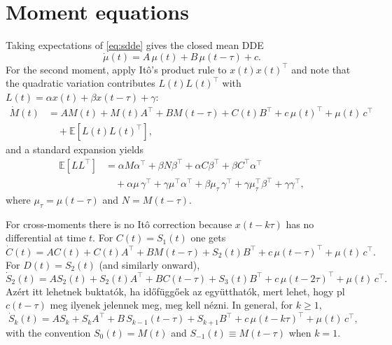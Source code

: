 \documentclass[11pt]{article}
\begin{document}
\section{Moment equations}
Taking expectations of \eqref{eq:sdde} gives the closed mean DDE
\begin{equation}\label{eq:mean}
  \dot\mu(t) = A\,\mu(t) + B\,\mu(t-\tau) + c.
\end{equation}
For the second moment, apply It\^o's product rule to $x(t)x(t)^\top$ and note that the quadratic variation contributes $L(t)L(t)^\top$ with
$L(t)=\alpha x(t)+\beta x(t-\tau)+\gamma$:
\begin{align}\label{eq:Mdot}
  \dot M(t) &= A M(t) + M(t)A^\top + B M(t-\tau) + C(t) B^\top + c\,\mu(t)^\top + \mu(t)\,c^\top
  \nonumber\\
  &\quad + \mathbb{E}\!\left[L(t)L(t)^\top\right],
\end{align}
and a standard expansion yields
\begin{align}\label{eq:ELLT}
\mathbb{E}\!\left[L L^\top\right] &=
  \alpha M\alpha^\top + \beta N\beta^\top + \alpha C\beta^\top + \beta C^\top\alpha^\top
  \nonumber\\
&\quad + \alpha\mu\,\gamma^\top + \gamma\mu^\top\alpha^\top
      + \beta\mu_\tau\,\gamma^\top + \gamma\mu_\tau^\top\beta^\top + \gamma\gamma^\top,
\end{align}
where $\mu_\tau=\mu(t-\tau)$ and $N=M(t-\tau)$.

For cross-moments there is no It\^o correction because $x(t-k\tau)$ has no differential at time $t$.
For $C(t)=S_1(t)$ one gets
\begin{equation}\label{eq:Cd}
  \dot C(t) = A C(t) + C(t)A^\top + B M(t-\tau) + S_2(t) B^\top + c\,\mu(t-\tau)^\top + \mu(t)\,c^\top.
\end{equation}
For $D(t)=S_2(t)$ (and similarly onward),
\begin{equation}\label{eq:Dd}
  \dot S_2(t) = A S_2(t) + S_2(t)A^\top + B C(t-\tau) + S_3(t) B^\top + c\,\mu(t-2\tau)^\top + \mu(t)\,c^\top.
\end{equation}
\color{red}
Azért itt lehetnek buktatók, ha időfüggőek az együtthatók, mert lehet, hogy pl $c(t-\tau)$ meg ilyenek jelennek meg, meg kell nézni.
\color{black}
In general, for $k\ge1$,
\begin{equation}\label{eq:Sk}
  \boxed{\;\dot S_k(t) = A S_k + S_k A^\top + B\,S_{k-1}(t-\tau) + S_{k+1} B^\top + c\,\mu(t-k\tau)^\top + \mu(t)\,c^\top,\;}
\end{equation}
with the convention $S_0(t)=M(t)$ and $S_{-1}(t)\equiv M(t-\tau)$ when $k=1$.
\end{document}
